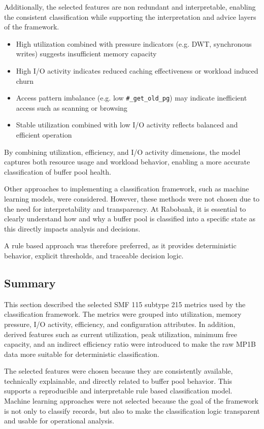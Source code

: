 Additionally, the selected features are non redundant and interpretable, enabling the consistent classification while supporting the interpretation and advice layers of the framework.

\begin{itemize}
    \item High utilization combined with pressure indicators (e.g. DWT, synchronous writes) suggests insufficient memory capacity
    \item High I/O activity indicates reduced caching effectiveness or workload induced churn
    \item Access pattern imbalance (e.g. low \texttt{\#\_get\_old\_pg}) may indicate inefficient access such as scanning or browsing
    \item Stable utilization combined with low I/O activity reflects balanced and efficient operation
\end{itemize}

By combining utilization, efficiency, and I/O activity dimensions, the model captures both resource usage and workload behavior, enabling a more accurate classification of buffer pool health.

Other approaches to implementing a classification framework, such as machine learning models, were considered. However, these methods were not chosen due to the need for interpretability and transparency. At Rabobank, it is essential to clearly understand how and why a buffer pool is classified into a specific state as this directly impacts analysis and decisions. 

A rule based approach was therefore preferred, as it provides deterministic behavior, explicit thresholds, and traceable decision logic.

\subsection{Summary}

This section described the selected SMF 115 subtype 215 metrics used by the classification framework. The metrics were grouped into utilization, memory pressure, I/O activity, efficiency, and configuration attributes. In addition, derived features such as current utilization, peak utilization, minimum free capacity, and an indirect efficiency ratio were introduced to make the raw MP1B data more suitable for deterministic classification.

The selected features were chosen because they are consistently available, technically explainable, and directly related to buffer pool behavior. This supports a reproducible and interpretable rule based classification model. Machine learning approaches were not selected because the goal of the framework is not only to classify records, but also to make the classification logic transparent and usable for operational analysis. 


